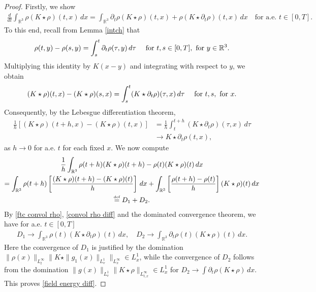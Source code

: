 \documentclass[reqno,11pt,final]{amsart}
\theoremstyle{plain}
\numberwithin{equation}{section}
\numberwithin{theorem}{section}
\newcommand{\eqdef }{\overset{\mbox{\tiny{def}}}{=}}
\begin{document}
\begin{proof}
    Firstly, we show
    \begin{align}\label{field energy diff}
        \frac{d}{dt}\int_{\mathbb{R}^3} \rho(K\star\rho)(t,x)\,dx = \int_{\mathbb{R}^3} \partial_t\rho(K\star\rho)(t,x) + \rho(K\star\partial_t\rho)(t,x)\,dx \quad \text{for a.e. }t\in[0,T].
    \end{align}To this end, recall from Lemma \ref{intch} that
    \begin{align*}
        \rho(t,y) - \rho(s,y) = \int_s^t \partial_t\rho(\tau,y)\,d\tau \quad \textup{ for } t,s\in[0,T], \textup{ for }y\in\mathbb{R}^3.
    \end{align*}Multiplying this identity by $K(x-y)$ and integrating with respect to $y$, we obtain
    \begin{align}\label{ftc convol rho}
        (K\star\rho)(t,x) - (K\star\rho)(s,x) = \int_s^t (K\star\partial_t\rho)(\tau,x)\,d\tau \quad \textup{ for }t,s, \textup{ for }x.
    \end{align}Consequently, by the Lebesgue differentiation theorem,
    \begin{align}\nonumber
        \frac{1}{h}\left[(K\star\rho)(t+h,x) - (K\star\rho)(t,x)\right] &= \frac{1}{h}\int_t^{t+h} (K\star\partial_t\rho)(\tau,x)\,d\tau\\
        &\to K\star\partial_t\rho(t,x),\label{convol rho diff}
    \end{align} as $h\to0$ for a.e. $t$ for each fixed $x$. We now compute
    \begin{multline*}
        \frac{1}{h}\int_{\mathbb{R}^3} \rho(t+h)(K\star\rho)(t+h) - \rho(t)(K\star\rho)(t) \,dx\\
        =\int_{\mathbb{R}^3} \rho(t+h)\left[\frac{(K\star\rho)(t+h) - (K\star\rho)(t)}{h}\right]\,dx + \int_{\mathbb{R}^3} \left[\frac{\rho(t+h) - \rho(t)}{h}\right](K\star\rho)(t)\,dx\\
        \eqdef D_1 + D_2.
    \end{multline*}
    By \eqref{ftc convol rho}, \eqref{convol rho diff} and the dominated convergence theorem, we have for a.e. $t\in[0,T]$
    \begin{align*}
        D_1\to \int_{\mathbb{R}^3} \rho(t)(K\star\partial_t\rho)(t)\,dx , \quad D_2\to\int_{\mathbb{R}^3} \partial_t\rho(t)(K\star\rho)(t)\,dx.
    \end{align*}Here the convergence of $D_1$ is justified by the domination $\|\rho(x)\|_{L^\infty_t}\|K\star \|g_1(x)\|_{L^1_v}\|_{L^\infty_x}\in L^1_x$, while the convergence of $D_2$ follows from the domination $\|g(x)\|_{L^1_v}\|K\star\rho\|_{L^\infty_{t,x}}\in L^1_x$ for $D_2 \to\int \partial_t\rho (K\star\rho)\,dx$. This proves \eqref{field energy diff}.


\end{proof}
\end{document}
